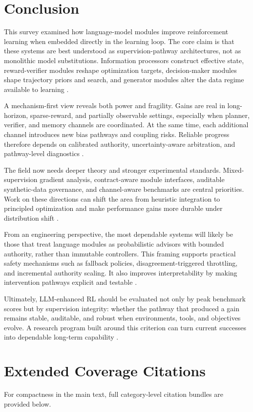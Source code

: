 ﻿\documentclass[conference]{IEEEtran}
\begin{document}
\section{Conclusion}
This survey examined how language-model modules improve reinforcement learning when embedded directly in the learning loop. The core claim is that these systems are best understood as supervision-pathway architectures, not as monolithic model substitutions. Information processors construct effective state, reward-verifier modules reshape optimization targets, decision-maker modules shape trajectory priors and search, and generator modules alter the data regime available to learning \cite{arxiv_p_2204_01691,arxiv_p_2310_12931,arxiv_p_2404_03648,arxiv_p_2602_02454,arxiv_p_2602_07848}.

A mechanism-first view reveals both power and fragility. Gains are real in long-horizon, sparse-reward, and partially observable settings, especially when planner, verifier, and memory channels are coordinated. At the same time, each additional channel introduces new bias pathways and coupling risks. Reliable progress therefore depends on calibrated authority, uncertainty-aware arbitration, and pathway-level diagnostics \cite{arxiv_p_2602_06493,arxiv_p_2602_12579,arxiv_p_2602_00994,arxiv_p_2602_14468}.

The field now needs deeper theory and stronger experimental standards. Mixed-supervision gradient analysis, contract-aware module interfaces, auditable synthetic-data governance, and channel-aware benchmarks are central priorities. Work on these directions can shift the area from heuristic integration to principled optimization and make performance gains more durable under distribution shift \cite{arxiv_p_2602_16165,arxiv_p_2601_06845,arxiv_p_2204_01691,arxiv_p_2602_02137,arxiv_p_2411_02337,arxiv_p_2601_21570}.

From an engineering perspective, the most dependable systems will likely be those that treat language modules as probabilistic advisors with bounded authority, rather than immutable controllers. This framing supports practical safety mechanisms such as fallback policies, disagreement-triggered throttling, and incremental authority scaling. It also improves interpretability by making intervention pathways explicit and testable \cite{arxiv_p_2602_06493,arxiv_p_2602_12579,arxiv_p_2512_05686,arxiv_p_2404_03648}.

Ultimately, LLM-enhanced RL should be evaluated not only by peak benchmark scores but by supervision integrity: whether the pathway that produced a gain remains stable, auditable, and robust when environments, tools, and objectives evolve. A research program built around this criterion can turn current successes into dependable long-term capability \cite{arxiv_p_2512_05686,arxiv_p_2602_09367,arxiv_p_2602_13156}.

\appendix
\section{Extended Coverage Citations}
For compactness in the main text, full category-level citation bundles are provided below.




\end{document}
